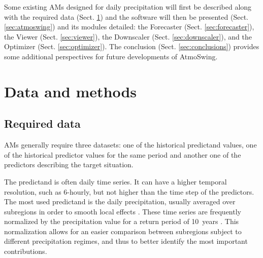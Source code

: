 \documentclass[review]{elsarticle}
\begin{document}
Some existing AMs designed for daily precipitation will first be described along with the required data (Sect. \ref{sec:data_methods}) and the software will then be presented (Sect. \ref{sec:atmoswing}) and its modules detailed: the Forecaster (Sect. \ref{sec:forecaster}), the Viewer (Sect. \ref{sec:viewer}), the Downscaler (Sect. \ref{sec:downscaler}), and the Optimizer (Sect. \ref{sec:optimizer}). The conclusion (Sect. \ref{sec:conclusions}) provides some additional perspectives for future developments of AtmoSwing. 


\section{Data and methods}
\label{sec:data_methods}


\subsection{Required data}
\label{sec:data}

AMs generally require three datasets: one of the historical predictand values, one of the historical predictor values for the same period and another one of the predictors describing the target situation.

The predictand is often daily time series. It can have a higher temporal resolution, such as 6-hourly, but not higher than the time step of the predictors. The most used predictand is the daily precipitation, usually averaged over subregions in order to smooth local effects \citep{Obled2002, Marty2012}. These time series are frequently normalized by the precipitation value for a return period of 10~years \citep{Djerboua2001}. This normalization allows for an easier comparison between subregions subject to different precipitation regimes, and thus to better identify the most important contributions.
\end{document}
